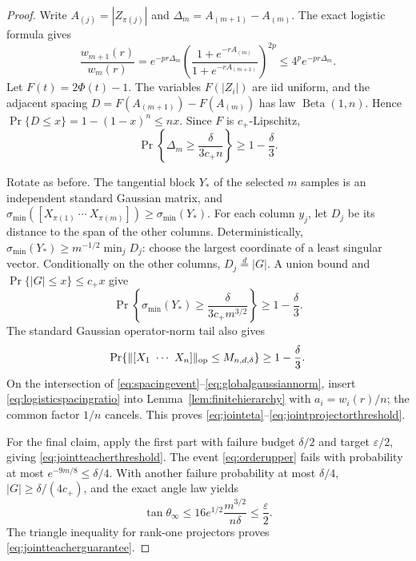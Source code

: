 \documentclass[11pt]{article}
\begin{document}
\begin{proof}
Write $A_{(j)}=|Z_{\pi(j)}|$ and $\Delta_m=A_{(m+1)}-A_{(m)}$.  The exact logistic formula gives
\begin{equation}
 \frac{w_{m+1}(r)}{w_m(r)}
 =e^{-pr\Delta_m}
 \left(\frac{1+e^{-rA_{(m)}}}{1+e^{-rA_{(m+1)}}}\right)^{2p}
 \le4^pe^{-pr\Delta_m}.
 \label{eq:logisticspacingratio}
\end{equation}
Let $F(t)=2\Phi(t)-1$.  The variables $F(|Z_i|)$ are iid uniform, and the adjacent spacing
$D=F(A_{(m+1)})-F(A_{(m)})$ has law $\operatorname{Beta}(1,n)$.  Hence
$\Pr\{D\le x\}=1-(1-x)^n\le nx$.  Since $F$ is $c_+$-Lipschitz,
\begin{equation}
 \Pr\left\{\Delta_m\ge\frac{\delta}{3c_+n}\right\}\ge1-\frac\delta3.
 \label{eq:spacingevent}
\end{equation}

Rotate as before.  The tangential block $Y_*$ of the selected $m$ samples is an independent standard Gaussian
matrix, and $\sigma_{\min}([X_{\pi(1)}\ \cdots\ X_{\pi(m)}])\ge\sigma_{\min}(Y_*)$.
For each column $y_j$, let $D_j$ be its distance to the span of the other columns.  Deterministically,
$\sigma_{\min}(Y_*)\ge m^{-1/2}\min_jD_j$: choose the largest coordinate of a least singular vector.
Conditionally on the other columns, $D_j\stackrel d=|G|$.  A union bound and
$\Pr\{|G|\le x\}\le c_+x$ give
\begin{equation}
 \Pr\left\{\sigma_{\min}(Y_*)\ge\frac{\delta}{3c_+m^{3/2}}\right\}
 \ge1-\frac\delta3.
 \label{eq:selectedconditioning}
\end{equation}
The standard Gaussian operator-norm tail also gives
\begin{equation}
 \Pr\{\lVert[X_1\ \cdots\ X_n]\rVert_{\rm op}\le M_{n,d,\delta}\}
 \ge1-\frac\delta3.
 \label{eq:globalgaussiannorm}
\end{equation}
On the intersection of \eqref{eq:spacingevent}--\eqref{eq:globalgaussiannorm}, insert
\eqref{eq:logisticspacingratio} into Lemma~\ref{lem:finitehierarchy} with $a_i=w_i(r)/n$; the common factor
$1/n$ cancels.  This proves
\eqref{eq:jointeta}--\eqref{eq:jointprojectorthreshold}.

For the final claim, apply the first part with failure budget $\delta/2$ and target $\varepsilon/2$, giving
\eqref{eq:jointteacherthreshold}.  The event \eqref{eq:orderupper} fails with probability at most
$e^{-9m/8}\le\delta/4$.  With another failure probability at most $\delta/4$,
$|G|\ge\delta/(4c_+)$, and the exact angle law yields
\[
 \tan\theta_\infty\le16e^{1/2}\frac{m^{3/2}}{n\delta}\le\frac\varepsilon2.
\]
The triangle inequality for rank-one projectors proves \eqref{eq:jointteacherguarantee}.
\end{proof}
\end{document}
